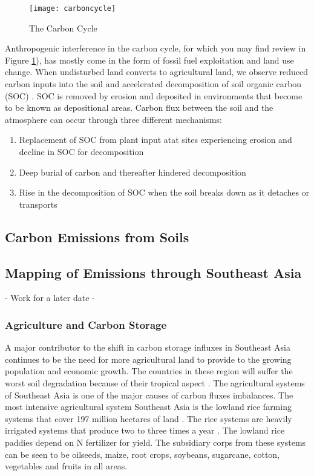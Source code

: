 \begin{figure}
\texttt{[image: carboncycle]}
\caption{The Carbon Cycle}
\label{fig:carboncycle}
\end{figure}

Anthropogenic interference in the carbon cycle, for which you may find review in Figure \ref{fig:carboncycle}), has mostly come in the form of fossil fuel exploitation and land use change. When undisturbed land converts to agricultural land, we observe reduced carbon inputs into the soil and accelerated decomposition of soil organic carbon (SOC) \citep{van2007impact}. SOC is removed by erosion and deposited in environments that become to be known as depositional areas. Carbon flux between the soil and the atmosphere can occur through three different mechanisms: 

\begin{enumerate}
  \item Replacement of SOC from plant input atat sites experiencing erosion and decline in SOC for decomposition
  \item Deep burial of carbon and thereafter hindered decomposition
  \item Rise in the decomposition of SOC when the soil breaks down as it detaches or transports
\end{enumerate}


\subsection{Carbon Emissions from Soils}

\subsection {Mapping of Emissions through Southeast Asia}
- Work for a later date -

\subsubsection{Agriculture and Carbon Storage}

A major contributor to the shift in carbon storage influxes in Southeast Asia continues to be the need for more agricultural land to provide to the growing population and economic growth. The countries in these region will suffer the worst soil degradation because of their tropical aspect \citep{scherr1999soil}. The agricultural systems of Southeast Asia is one of the major causes of carbon fluxes imbalances. The most intensive agricultural system Southeast Asia is the lowland rice farming systems that cover 197 million hectares of land \citep{dixon2001nonalcoholic}. The rice systems are heavily irrigated systems that produce two to three times a year \citep{cassman1995extrapolating}. The lowland rice paddies depend on N fertilizer for yield. The subsidiary corps from these systems can be seen to be oilseeds, maize, root crops, soybeans, sugarcane, cotton, vegetables and fruits in all areas.



